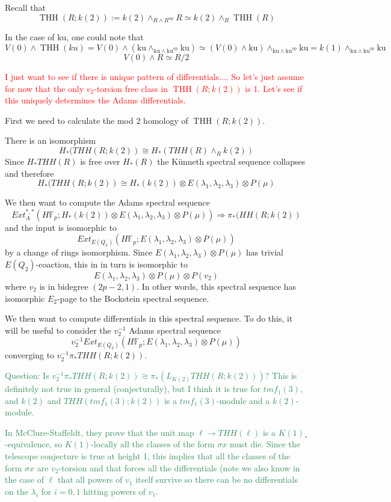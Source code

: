 \documentclass[12pt]{amsart}
\newcommand{\ku}{\mathrm{ku}}
\DeclareMathOperator{\THH}{THH}
\newcommand{\op}{\mathrm{op}}
\theoremstyle{definition}
\numberwithin{equation}{section}
\numberwithin{figure}{section}
\begin{document}
Recall that 
\[
\THH(R;k(2)):= k(2)\wedge_{R\wedge R^\op}R\simeq k(2)\wedge_R\THH(R)
\]

In the case of $\ku$, one could note that 
\[
V(0)\wedge \THH(ku) = V(0)\wedge (\ku\wedge_{\ku\wedge \ku^\op}\ku)\simeq (V(0)\wedge \ku)\wedge_{\ku\wedge\ku^{\op}}\ku = k(1)\wedge_{\ku\wedge\ku^{\op}}\ku
\]
\[
V(0)\wedge R\simeq R/2 
\]

\textcolor{red}{I just want to see if there is unique pattern of differentials.... So let's just assume for now that the only $v_2$-torsion free class in $\THH(R;k(2))$ is 1. Let's see if this uniquely determines the Adams differentials.}

First we need to calculate the mod 2 homology of $\THH(R;k(2))$.

 There is an isomorphism
\[ H_*(THH(R;k(2))\cong  H_*(THH(R)\wedge_R k(2)) \]
Since $H_*THH(R)$ is free over $H_*(R)$ the K\"unneth spectral sequence collapses and therefore 
\[ H_*(THH(R;k(2))\cong H_*(k(2))\otimes E(\lambda_1, \lambda_2, \lambda_3)\otimes P(\mu)\]

We then want to compute the Adams spectral sequence 
\[ Ext_{A}^{*,*}(H\mathbb{F}_p;H_*(k(2))\otimes E(\lambda_1, \lambda_2, \lambda_3)\otimes P(\mu))\Rightarrow \pi_*(HH(R;k(2))\]
and the input is isomorphic to 
\[Ext_{E(Q_2)}(H\mathbb{F}_p; E(\lambda_1, \lambda_2, \lambda_3)\otimes P(\mu)) \]
by a change of rings isomorphism. Since $E(\lambda_1, \lambda_2, \lambda_3)\otimes P(\mu)$ has trivial $E(Q_2)$-coaction, this in in turn is isomorphic to 
\[ E(\lambda_1, \lambda_2, \lambda_3)\otimes P(\mu)\otimes P(v_2) \]
where $v_2$ is in bidegree $(2p-2,1)$. In other words, this spectral sequence has isomorphic $E_2$-page to the Bockstein spectral sequence. 

We then want to compute differentials in this spectral sequence. To do this, it will be useful to consider the $v_2^{-1}$ Adams spectral sequence
\[ v_2^{-1}Ext_{E(Q_2)}(H\mathbb{F}_p; E(\lambda_1, \lambda_2, \lambda_3)\otimes P(\mu)) \] 
converging to $v_2^{-1}\pi_*THH(R;k(2))$. 

\textcolor{seagreen}{
Question: Is $v_2^{-1}\pi_*THH(R;k(2))\cong \pi_*(L_{K(2)}THH(R;k(2)))$? 
This is definitely not true in general (conjecturally), but I think it is true for $tmf_1(3)$, and $k(2)$ and $THH(tmf_1(3);k(2))$ is a $tmf_1(3)$-module and a $k(2)$-module. }

\textcolor{seagreen}{
In McClure-Staffeldt, they prove that the unit map $\ell \rightarrow THH(\ell)$ is a $K(1)_*$-equivalence, so $K(1)$-locally all the classes of the form $\sigma x$ must die. Since the telescope conjecture is true at height 1, this implies that all the classes of the form $\sigma x$ are $v_2$-torsion and that forces all the differentials (note we also know in the case of $\ell$ that all powers of $v_1$ itself survive so there can be no differentials on the $\lambda_i$ for $i=0,1$ hitting powers of $v_1$. }







\end{document}
